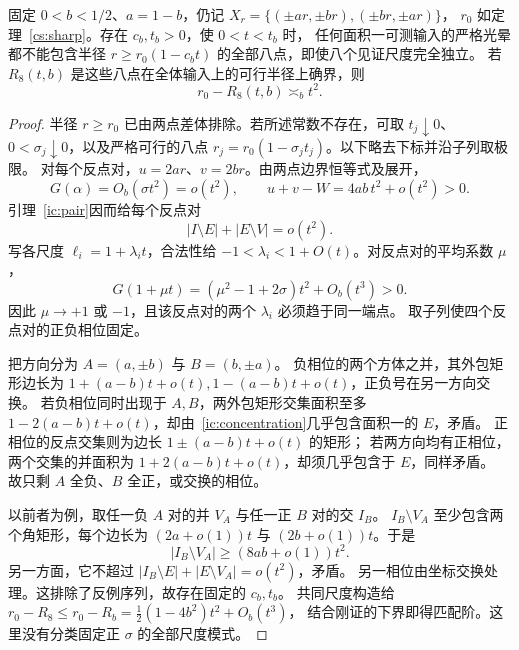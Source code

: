 \begin{theorem}[任意独立八尺度的二阶径向障碍]\label{ic:radial}
固定 $0<b<1/2$、$a=1-b$，仍记 $X_r=\{(\pm ar,\pm br),(\pm br,\pm ar)\}$，
$r_0$ 如定理~\ref{cs:sharp}。存在 $c_b,t_b>0$，使 $0<t<t_b$ 时，
任何面积一可测输入的严格光晕都不能包含半径
$r\ge r_0(1-c_bt)$ 的全部八点，即使八个见证尺度完全独立。
若 $R_8(t,b)$ 是这些八点在全体输入上的可行半径上确界，则
\[
 r_0-R_8(t,b)\asymp_b t^2.
\]
\end{theorem}
\begin{proof}
半径 $r\ge r_0$ 已由两点差体排除。若所述常数不存在，可取
$t_j\downarrow0$、$0<\sigma_j\downarrow0$，以及严格可行的八点
$r_j=r_0(1-\sigma_jt_j)$。以下略去下标并沿子列取极限。
对每个反点对，$u=2ar$、$v=2br$。由两点边界恒等式及展开，
\[
 G(\alpha)=O_b(\sigma t^2)=o(t^2),\qquad
 u+v-W=4ab\,t^2+o(t^2)>0.
\]
引理~\ref{ic:pair}因而给每个反点对
\begin{equation}\label{ic:concentration}
 |I\setminus E|+|E\setminus V|=o(t^2).
\end{equation}
写各尺度 $\ell_i=1+\lambda_i t$，合法性给
$-1<\lambda_i<1+O(t)$。对反点对的平均系数 $\mu$，
\[
 G(1+\mu t)=(\mu^2-1+2\sigma)t^2+O_b(t^3)>0.
\]
因此 $\mu\to+1$ 或 $-1$，且该反点对的两个 $\lambda_i$ 必须趋于同一端点。
取子列使四个反点对的正负相位固定。

把方向分为 $A=(a,\pm b)$ 与 $B=(b,\pm a)$。
负相位的两个方体之并，其外包矩形边长为
$1+(a-b)t+o(t),1-(a-b)t+o(t)$，正负号在另一方向交换。
若负相位同时出现于 $A,B$，两外包矩形交集面积至多
$1-2(a-b)t+o(t)$，却由~\eqref{ic:concentration}几乎包含面积一的 $E$，矛盾。
正相位的反点交集则为边长 $1\pm(a-b)t+o(t)$ 的矩形；
若两方向均有正相位，两个交集的并面积为
$1+2(a-b)t+o(t)$，却须几乎包含于 $E$，同样矛盾。
故只剩 $A$ 全负、$B$ 全正，或交换的相位。

以前者为例，取任一负 $A$ 对的并 $V_A$ 与任一正 $B$ 对的交 $I_B$。
$I_B\setminus V_A$ 至少包含两个角矩形，每个边长为
$(2a+o(1))t$ 与 $(2b+o(1))t$。于是
\[
 |I_B\setminus V_A|\ge(8ab+o(1))t^2.
\]
另一方面，它不超过 $|I_B\setminus E|+|E\setminus V_A|=o(t^2)$，矛盾。
另一相位由坐标交换处理。这排除了反例序列，故存在固定的 $c_b,t_b$。
共同尺度构造给
$r_0-R_8\le r_0-R_b=\tfrac12(1-4b^2)t^2+O_b(t^3)$，
结合刚证的下界即得匹配阶。这里没有分类固定正 $\sigma$ 的全部尺度模式。
\end{proof}

